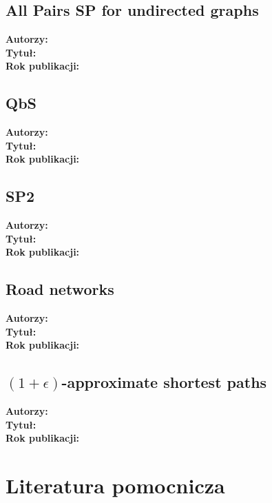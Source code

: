 \documentclass{article}
\begin{document}
        \subsection{All Pairs SP for undirected graphs\cite{Roditty_Zwick_2012}}
            \textbf{Autorzy: } \\
            \textbf{Tytuł: } \\
            \textbf{Rok publikacji: } \\

        \subsection{QbS\cite{Wang_Wang_Koehler_Lin_2021}}
            \textbf{Autorzy: } \\
            \textbf{Tytuł: } \\
            \textbf{Rok publikacji: } \\

        \subsection{SP2\cite{Dolgorsuren_Xu_Khan_Jeong_Lee_2016}}
            \textbf{Autorzy: } \\
            \textbf{Tytuł: } \\
            \textbf{Rok publikacji: } \\

        \subsection{Road networks\cite{Aggarwal_Gollapudi_Raghavender_Sinop_2021}}
            \textbf{Autorzy: } \\
            \textbf{Tytuł: } \\
            \textbf{Rok publikacji: } \\

        \subsection{$(1+\epsilon)$-approximate shortest paths\cite{Elkin_Trehan_2022}}
            \textbf{Autorzy: } \\
            \textbf{Tytuł: } \\
            \textbf{Rok publikacji: } \\

    \section{Literatura pomocnicza}
\end{document}
